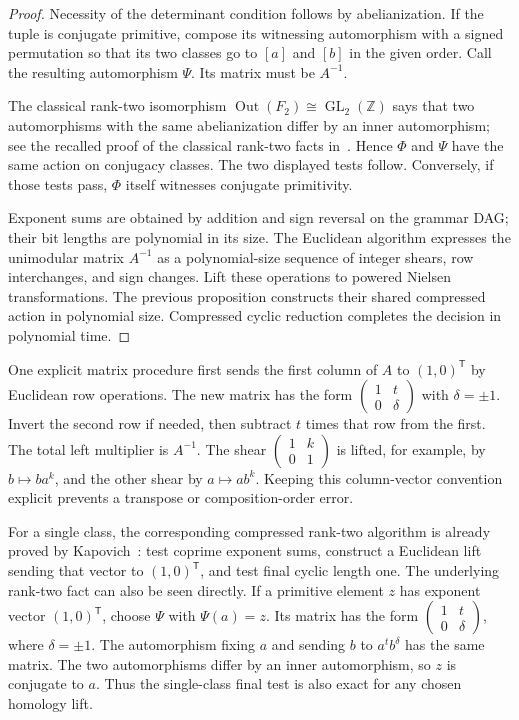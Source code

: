 \begin{proof}
Necessity of the determinant condition follows by abelianization.  If the
tuple is conjugate primitive, compose its witnessing automorphism with a
signed permutation so that its two classes go to $[a]$ and $[b]$ in the
given order.  Call the resulting automorphism $\Psi$.  Its matrix must be
$A^{-1}$.

The classical rank-two isomorphism
$\operatorname{Out}(F_2)\cong\operatorname{GL}_2(\mathbb Z)$ says that
two automorphisms with the same abelianization differ by an inner
automorphism; see the recalled proof of the classical rank-two facts
in~\cite[Proposition~8.1]{kapovich2026}.  Hence $\Phi$ and $\Psi$ have the same action on conjugacy
classes.  The two displayed tests follow.  Conversely, if those tests pass,
$\Phi$ itself witnesses conjugate primitivity.

Exponent sums are obtained by addition and sign reversal on the grammar
DAG; their bit lengths are polynomial in its size.  The Euclidean algorithm
expresses the unimodular matrix $A^{-1}$ as a polynomial-size sequence of
integer shears, row interchanges, and sign changes.  Lift these operations
to powered Nielsen transformations.  The previous proposition constructs
their shared compressed action in polynomial size.  Compressed cyclic
reduction completes the decision in polynomial time.
\end{proof}

One explicit matrix procedure first sends the first column of $A$ to
$(1,0)^\mathsf{T}$ by Euclidean row operations.  The new matrix has the
form $\left(\begin{smallmatrix}1&t\\0&\delta\end{smallmatrix}\right)$
with $\delta=\pm1$.  Invert the second row if needed, then subtract $t$
times that row from the first.  The total left multiplier is $A^{-1}$.
The shear $\left(\begin{smallmatrix}1&k\\0&1\end{smallmatrix}\right)$
is lifted, for example, by $b\mapsto ba^k$, and the other shear by
$a\mapsto ab^k$.  Keeping this column-vector convention explicit prevents
a transpose or composition-order error.

For a single class, the corresponding compressed rank-two algorithm is
already proved by Kapovich~\cite[Theorem~8.7]{kapovich2026}: test coprime exponent sums, construct a
Euclidean lift sending that vector to $(1,0)^\mathsf{T}$, and test final
cyclic length one.  The underlying rank-two fact can also be seen directly.
If a primitive element $z$ has exponent vector $(1,0)^\mathsf{T}$, choose
$\Psi$ with $\Psi(a)=z$.  Its matrix has the form
$\left(\begin{smallmatrix}1&t\\0&\delta\end{smallmatrix}\right)$,
where $\delta=\pm1$.  The automorphism fixing $a$ and sending
$b$ to $a^t b^\delta$ has the same matrix.  The two automorphisms differ
by an inner automorphism, so $z$ is conjugate to $a$.  Thus the single-class
final test is also exact for any chosen homology lift.

